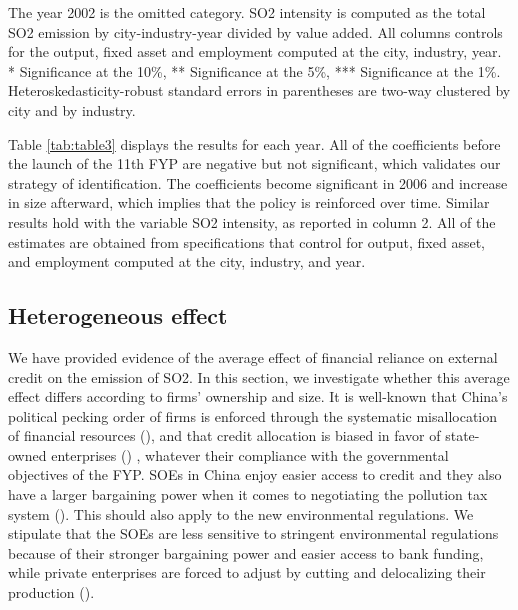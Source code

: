 \documentclass[12pt]{article}
\begin{document}
\begin{table}[hbt!]
{\begin{threeparttable}
\begin{tablenotes}
      \small
      \item The year 2002 is the omitted category. SO2 intensity is computed as the total SO2 emission by city-industry-year divided by value added. All columns controls for the output, fixed asset and employment computed at the city, industry, year. \\
      * Significance at the 10\%, ** Significance at the 5\%, *** Significance at the 1\%. Heteroskedasticity-robust standard errors in parentheses are two-way clustered by city and by industry.
    \end{tablenotes}
    \label{tab:table3}
\end{threeparttable}}
\end{table}

Table \ref{tab:table3} displays the results for each year. All of the coefficients before the launch of the 11th FYP are negative but not significant, which validates our strategy of identification. The coefficients become significant in 2006 and increase in size afterward, which implies that the policy is reinforced over time. Similar results hold with the variable SO2 intensity, as reported in column 2. All of the estimates are obtained from specifications that control for output, fixed asset, and employment computed at the city, industry, and year.


\subsection{Heterogeneous effect}

We have provided evidence of the average effect of financial reliance on external credit on the emission of SO2. In this section, we investigate whether this average effect differs according to firms’ ownership and size. It is well-known that China's political pecking order of firms is enforced through the systematic misallocation of financial resources (\cite{Dollar2007-dr}), and that credit allocation is biased in favor of state-owned enterprises (\cite{Huang2003-oa, Brandt2003-hu, Ferri2009-lh, Hale2011-ma}) , whatever their compliance with the governmental objectives of the FYP. SOEs in China enjoy easier access to credit and they also have a larger bargaining power when it comes to negotiating the pollution tax system (\cite{Wang2003-ar, Wang2005-yy}). This should also apply to the new environmental regulations. We stipulate that the SOEs are less sensitive to stringent environmental regulations because of their stronger bargaining power and easier access to bank funding, while private enterprises are forced to adjust by cutting and delocalizing their production (\cite{Hering2014-af}).
\end{document}
